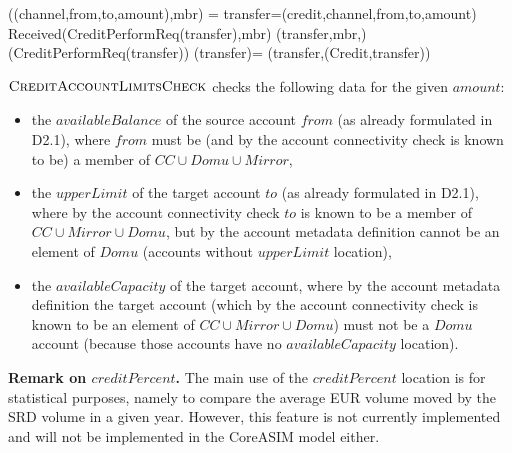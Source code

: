 \begin{asm}
((channel,from,to,amount),mbr)  =\+
\LET transfer=(credit,channel,from,to,amount)\\
\IF Received(CreditPerformReq(transfer),\FROM mbr) \THEN \+  
  (transfer,mbr,)\\
   (CreditPerformReq(transfer))\-
\WHERE \+
  (transfer)=\+
     (transfer,(Credit,transfer))
\end{asm}

$\hbox{\sc CreditAccountLimitsCheck}$ checks the following data for the given $amount$:
\begin{itemize}
	\item the $availableBalance$ of the source account $from$ (as already formulated in D2.1), where $from$ must be (and by the account connectivity check is known to be) a member of $CC \cup Domu \cup Mirror$,
	
	\item the $upperLimit$ of the target account $to$ (as already formulated in D2.1), where by the account connectivity check $to$ is known to be a member of $CC \cup  Mirror \cup Domu$, but by the account metadata definition cannot be an element of $Domu$ (accounts without $upperLimit$ location), 
	 
	 \item the $availableCapacity$ of the target account, where by the account metadata definition the target account (which by the account connectivity check is known to be an element of $CC \cup  Mirror \cup Domu$) must not be a $Domu$ account (because those accounts have no $availableCapacity$ location).
 \end{itemize} 

{\bf Remark on $creditPercent$.} The main use of the $creditPercent$ location is for statistical purposes, namely to compare the average EUR volume moved by the SRD volume in a given year. However, this feature is not currently implemented and will not be implemented in the CoreASIM model either.


